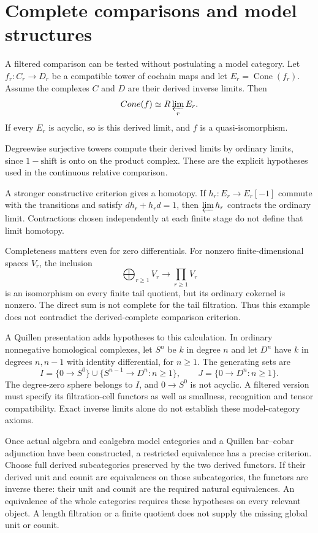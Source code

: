 \section{Complete comparisons and model structures}

A filtered comparison can be tested without
postulating a model category. Let
$f_r:C_r\to D_r$ be a compatible tower of
cochain maps and let
$E_r=\operatorname{Cone}(f_r)$.
Assume the complexes $C$ and $D$ are their
derived inverse limits. Then
\[
 \operatorname{Cone}(f)
       \simeq R\varprojlim_r E_r.
\]
If every $E_r$ is acyclic, so is this derived
limit, and $f$ is a quasi-isomorphism.

Degreewise surjective towers compute their
derived limits by ordinary limits, since
$1-\mathrm{shift}$ is onto on the product
complex. These are the explicit hypotheses
used in the continuous relative comparison.

A stronger constructive criterion gives a
homotopy. If $h_r:E_r\to E_r[-1]$ commute
with the transitions and satisfy
$dh_r+h_rd=1$, then $\varprojlim h_r$
contracts the ordinary limit. Contractions
chosen independently at each finite stage
do not define that limit homotopy.

Completeness matters even for zero
differentials. For nonzero finite-dimensional
spaces $V_r$, the inclusion
\[
 \bigoplus_{r\geq1}V_r\longrightarrow\prod_{r\geq1}V_r
\]
is an isomorphism on every finite tail
quotient, but its ordinary cokernel is
nonzero. The direct sum is not complete for
the tail filtration. Thus this example
does not contradict the derived-complete
comparison criterion.

A Quillen presentation adds hypotheses to
this calculation. In ordinary nonnegative
homological complexes, let $S^n$ be $k$ in degree $n$ and
let $D^n$ have $k$ in degrees $n,n-1$ with
identity differential, for $n\geq1$.
The generating sets are
\[
 I=\{0\to S^0\}\cup
       \{S^{n-1}\to D^n:n\geq1\},\qquad
 J=\{0\to D^n:n\geq1\}.
\]
The degree-zero sphere belongs to $I$,
and $0\to S^0$ is not acyclic. A filtered
version must specify its filtration-cell
functors as well as smallness, recognition
and tensor compatibility. Exact inverse
limits alone do not establish these
model-category axioms.

Once actual algebra and coalgebra model
categories and a Quillen bar--cobar
adjunction have been constructed, a
restricted equivalence has a precise
criterion. Choose full derived
subcategories preserved by the two
derived functors. If their derived unit
and counit are equivalences on those
subcategories, the functors are inverse
there: their unit and counit are the
required natural equivalences. An
equivalence of the whole categories
requires these hypotheses on every
relevant object. A length filtration or
a finite quotient does not supply the
missing global unit or counit.

